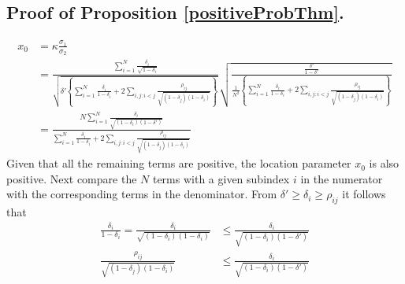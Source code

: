 \documentclass[12pt]{article}
\theoremstyle{definition}
\theoremstyle{definition}
\begin{document}
\subsection{Proof of Proposition \ref{positiveProbThm}.}
\begin{align*}
x_0 &= \kappa \frac{\sigma_1}{\sigma_2} \\
 &= \frac{ \sum_{i=1}^N \frac{\delta_i}{\sqrt{1-\delta_i}}}{\sqrt{\delta'  \left\{ \sum_{i=1}^N \frac{\delta_i}{1-\delta_i} + 2 \sum_{i,j: i<j} \frac{\rho_{ij}}{\sqrt{(1-\delta_j)(1-\delta_i)}}\right\}}} \sqrt{\frac{\frac{\delta'}{1-\delta'}}{\frac{1}{N^2} \left\{ \sum_{i=1}^N \frac{\delta_i}{1-\delta_i} + 2 \sum_{i,j: i<j} \frac{\rho_{ij}}{\sqrt{(1-\delta_j)(1-\delta_i)}}\right\} }}\\
&=  \frac{N \sum_{i=1}^N \frac{\delta_i}{\sqrt{(1-\delta_i)(1-\delta')}}}{ \sum_{i=1}^N \frac{\delta_i}{1-\delta_i} + 2 \sum_{i,j: i<j} \frac{\rho_{ij}}{\sqrt{(1-\delta_j)(1-\delta_i)}}}
\end{align*}
Given that all the remaining terms are positive, the location parameter $x_0$ is also positive. Next compare the $N$ terms with a given subindex $i$ in the numerator with the corresponding terms in the denominator. From $\delta' \geq \delta_i \geq \rho_{ij}$ it follows that 
\begin{align}
\frac{\delta_i}{1-\delta_i} = \frac{\delta_i}{\sqrt{(1-\delta_i)(1-\delta_i)}} &\leq \frac{\delta_i}{\sqrt{(1-\delta_i)(1-\delta')}} \label{ProofIneq1}\\
 \frac{\rho_{ij}}{\sqrt{(1-\delta_j)(1-\delta_i)}} &\leq \frac{\delta_i}{\sqrt{(1-\delta_i)(1-\delta')}} \label{ProofIneq2}
\end{align}
\end{document}
